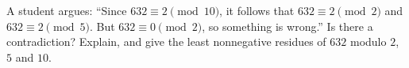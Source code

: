 A student argues: ``Since $632\equiv2\pmod{10}$, it follows that $632\equiv2\pmod 2$ and $632\equiv2\pmod5$. But $632\equiv0\pmod2$, so something is wrong.'' Is there a contradiction? Explain, and give the least nonnegative residues of $632$ modulo $2$, $5$ and $10$.
